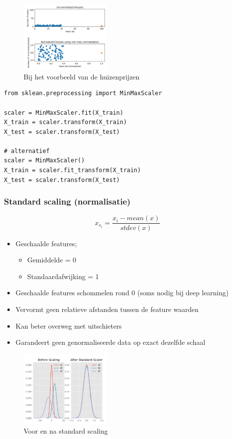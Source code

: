 \documentclass{article}
\begin{document}
\begin{figure}[H]
    \centering
    \includegraphics[width=0.4\textwidth]{min-max-houses.png}
    \caption{Bij het voorbeeld van de huizenprijzen}
\end{figure}

\begin{verbatim}
from sklean.preprocessing import MinMaxScaler

scaler = MinMaxScaler.fit(X_train)
X_train = scaler.transform(X_train)
X_test = scaler.transform(X_test)

# alternatief
scaler = MinMaxScaler()
X_train = scaler.fit_transform(X_train)
X_test = scaler.transform(X_test)
\end{verbatim}

\subsubsection{Standard scaling (normalisatie)}

\begin{equation}
x_{s_i} = \frac{x_i - mean(x)}{stdev(x)}
\end{equation}

\begin{itemize}
    \item Geschaalde features;
    \begin{itemize}
        \item Gemiddelde = 0
        \item Standaardafwijking = 1
    \end{itemize}
    \item Geschaalde features schommelen rond 0 (soms nodig bij deep learning)
    \item Vervormt geen relatieve afstanden tussen de feature waarden
    \item Kan beter overweg met uitschieters
    \item Garandeert geen genormaliseerde data op exact dezelfde schaal
\end{itemize}

\begin{figure}[H]
    \centering
    \includegraphics[width=0.4\textwidth]{standard-scaling.png}
    \caption{Voor en na standard scaling}
\end{figure}
\end{document}

